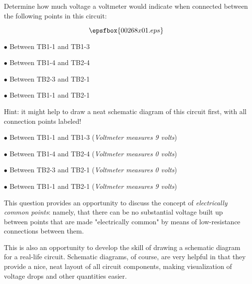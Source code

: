 

Determine how much voltage a voltmeter would indicate when connected between the following points in this circuit:

$$\epsfbox{00268x01.eps}$$

\medskip
\item{$\bullet$} Between TB1-1 and TB1-3
\item{$\bullet$} Between TB1-4 and TB2-4
\item{$\bullet$} Between TB2-3 and TB2-1
\item{$\bullet$} Between TB1-1 and TB2-1
\medskip

Hint: it might help to draw a neat schematic diagram of this circuit first, with all connection points labeled!







\medskip
\item{$\bullet$} Between TB1-1 and TB1-3 ({\it Voltmeter measures 9 volts})
\item{$\bullet$} Between TB1-4 and TB2-4 ({\it Voltmeter measures 0 volts})
\item{$\bullet$} Between TB2-3 and TB2-1 ({\it Voltmeter measures 0 volts})
\item{$\bullet$} Between TB1-1 and TB2-1 ({\it Voltmeter measures 9 volts})
\medskip







This question provides an opportunity to discuss the concept of {\it electrically common points}: namely, that there can be no substantial voltage built up between points that are made "electrically common" by means of low-resistance connections between them.

This is also an opportunity to develop the skill of drawing a schematic diagram for a real-life circuit.  Schematic diagrams, of course, are very helpful in that they provide a nice, neat layout of all circuit components, making visualization of voltage drops and other quantities easier.




